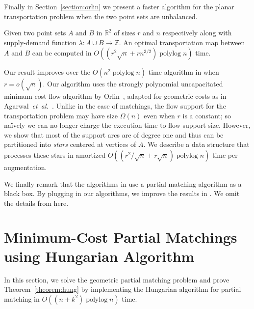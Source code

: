 \documentclass[a4paper,UKenglish]{socg-lipics-v2018}
\def\etal{\emph{et~al.}}
\def\etal{\textit{et~al.}}
\def\polylog{\mathop{\mathrm{polylog}}}
\def\reals{\mathbb{R}}
\def\ints{\mathbb{Z}}
\def\tsupply{\lambda}
\theoremstyle{plain}
\numberwithin{figure}{section}
\begin{document}
\medskip

Finally in Section~\ref{section:orlin} we present a faster algorithm for the
planar transportation problem when the two point sets are unbalanced.

\begin{theorem}
\label{theorem:orlin}
Given two point sets $A$ and $B$ in $\reals^2$ of sizes $r$ and $n$ respectively
along with supply-demand function $\tsupply:A \cup B \to \ints$.
An optimal transportation map between $A$ and $B$ can be computed in
$O((r^2\sqrt{n} + rn^{3/2})\polylog n)$ time.
\end{theorem}

Our result improves over the $O(n^2\polylog n)$ time algorithm in
\cite{AFPVX17} when $r = o(\sqrt{n})$.
Our algorithm uses the strongly polynomial uncapacitated minimum-cost
flow algorithm by Orlin~\cite{O93}, adapted for geometric costs as in
Agarwal~\etal~\cite{AFPVX17}.
Unlike in the case of matchings, the flow support for the transportation problem may have size $\Omega(n)$
even when $r$ is a constant; so na\"ively we can no longer charge the execution time to flow support size.
However, we show that most of the support arcs are of degree one and thus can be partitioned
into \emph{stars} centered at vertices of $A$.
We describe a data structure that processes these stars in amortized
$O((r^2/\sqrt{n} + r\sqrt{n})\polylog n)$ time per augmentation.

We finally remark that the algorithms in \cite{AKKMRSX18} use a partial matching
algorithm as a black box.
By plugging in our algorithms, we improve the results in \cite{AKKMRSX18}.
We omit the details from here.

\section{Minimum-Cost Partial Matchings using Hungarian Algorithm}
\label{section:hung}

In this section, we solve the geometric partial matching problem and prove Theorem~\ref{theorem:hung} by implementing the Hungarian algorithm for partial matching in $O((n + k^2)\polylog n)$ time.
\end{document}
